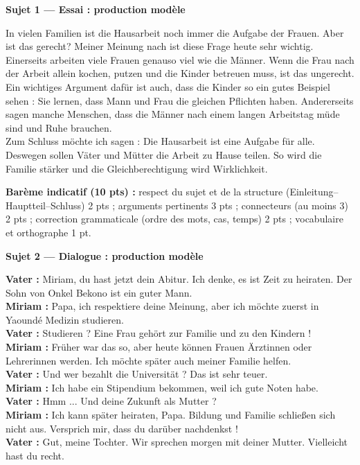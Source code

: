 \documentclass[11pt]{article}
\begin{document}
\begin{corrige}
\textbf{Sujet 1 — Essai : production modèle}

\begin{textebox}
In vielen Familien ist die Hausarbeit noch immer die Aufgabe der Frauen. Aber ist das gerecht? Meiner Meinung nach ist diese Frage heute sehr wichtig.\\
Einerseits arbeiten viele Frauen genauso viel wie die Männer. Wenn die Frau nach der Arbeit allein kochen, putzen und die Kinder betreuen muss, ist das ungerecht. Ein wichtiges Argument dafür ist auch, dass die Kinder so ein gutes Beispiel sehen : Sie lernen, dass Mann und Frau die gleichen Pflichten haben. Andererseits sagen manche Menschen, dass die Männer nach einem langen Arbeitstag müde sind und Ruhe brauchen.\\
Zum Schluss möchte ich sagen : Die Hausarbeit ist eine Aufgabe für alle. Deswegen sollen Väter und Mütter die Arbeit zu Hause teilen. So wird die Familie stärker und die Gleichberechtigung wird Wirklichkeit.
\end{textebox}

\textbf{Barème indicatif (10 pts) :} respect du sujet et de la structure (Einleitung–Hauptteil–Schluss) 2 pts ; arguments pertinents 3 pts ; connecteurs (au moins 3) 2 pts ; correction grammaticale (ordre des mots, cas, temps) 2 pts ; vocabulaire et orthographe 1 pt.

\textbf{Sujet 2 — Dialogue : production modèle}

\begin{textebox}
\textbf{Vater :} Miriam, du hast jetzt dein Abitur. Ich denke, es ist Zeit zu heiraten. Der Sohn von Onkel Bekono ist ein guter Mann.\\
\textbf{Miriam :} Papa, ich respektiere deine Meinung, aber ich möchte zuerst in Yaoundé Medizin studieren.\\
\textbf{Vater :} Studieren ? Eine Frau gehört zur Familie und zu den Kindern !\\
\textbf{Miriam :} Früher war das so, aber heute können Frauen Ärztinnen oder Lehrerinnen werden. Ich möchte später auch meiner Familie helfen.\\
\textbf{Vater :} Und wer bezahlt die Universität ? Das ist sehr teuer.\\
\textbf{Miriam :} Ich habe ein Stipendium bekommen, weil ich gute Noten habe.\\
\textbf{Vater :} Hmm ... Und deine Zukunft als Mutter ?\\
\textbf{Miriam :} Ich kann später heiraten, Papa. Bildung und Familie schließen sich nicht aus. Versprich mir, dass du darüber nachdenkst !\\
\textbf{Vater :} Gut, meine Tochter. Wir sprechen morgen mit deiner Mutter. Vielleicht hast du recht.
\end{textebox}


\end{corrige}
\end{document}
